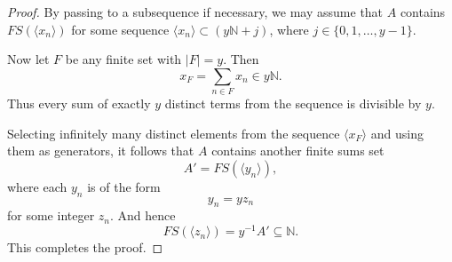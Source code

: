 \documentclass[10pt,a4paper]{amsart}
\begin{document}
\begin{proof}
By passing to a subsequence if necessary, we may assume that 
\(A\) contains \(FS(\langle x_n \rangle)\) for some sequence 
\(\langle x_n \rangle \subset (y\mathbb{N}+j)\), where 
\(j \in \{0,1,\ldots ,y-1\}\).

Now let \(F\) be any finite set with \(|F|=y\). Then
\[
x_F=\sum_{n\in F} x_n \in y\mathbb{N}.
\]
Thus every sum of exactly \(y\) distinct terms from the sequence 
is divisible by \(y\).

Selecting infinitely many distinct elements from the sequence 
\(\langle x_F\rangle\) and using them as generators, it follows that 
\(A\) contains another finite sums set
\[
A' = FS(\langle y_n\rangle),
\]
where each \(y_n\) is of the form
\[
y_n = y z_n
\]
for some integer \(z_n\). And hence $$FS(\langle z_n\rangle)= y^{-1}A'\subseteq \mathbb{N}.$$ This completes the proof.
\end{proof}
\end{document}
